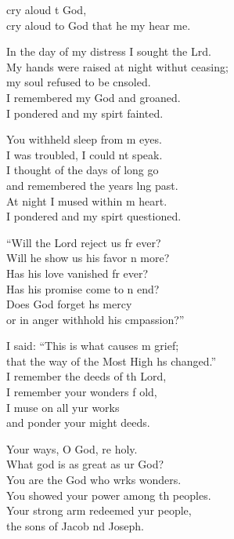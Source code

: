\settowidth{\versewidth}{My hands were raised at night without ceasing; *}
\begin{psalmverse}%
  \begin{patverse}
     cry aloud t God,\Med\\
cry aloud to God that he my hear me.

In the day of my distress I sought the Lrd.\Flex\\
My hands were raised at night withut ceasing;\Med\\
my soul refused to be cnsoled.\\
I remembered my God and  groaned.\Med\\
I pondered and my spir\pointup{\i}t fainted.

You withheld sleep from m eyes.\Med\\
I was troubled, I could nt speak.\\
I thought of the days of long go\Med\\
and remembered the years lng past.\\
At night I mused within m heart.\Med\\
I pondered and my spir\pointup{\i}t questioned.

“Will the Lord reject us fr ever?\Med\\
Will he show us his favor n more?\\
Has his love vanished fr ever?\Med\\
Has his promise come to n end?\\
Does God forget h\pointup{\i}s mercy\Med\\
or in anger withhold his cmpassion?”

I said: “This is what causes m grief;\Med\\
that the way of the Most High hs changed.”\\
I remember the deeds of th Lord,\Med\\
I remember your wonders f old,\\
I muse on all yur works\Med\\
and ponder your might deeds.

Your ways, O God, re holy.\Med\\
What god is as great as ur God?\\
You are the God who wrks wonders.\Med\\
You showed your power among th peoples.\\
Your strong arm redeemed yur people,\Med\\
the sons of Jacob nd Joseph.


\end{patverse}
\end{psalmverse}
